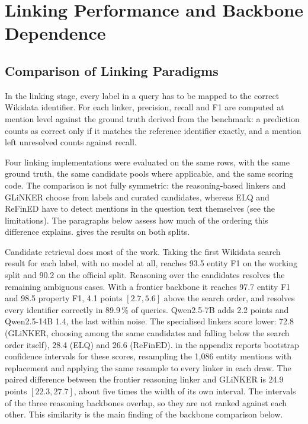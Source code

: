 \section{Linking Performance and Backbone
Dependence}

\subsection{Comparison of Linking
Paradigms}

\label{sec:res-linkers}

In the linking stage, every label in a query has to be mapped to the correct Wikidata identifier.
For each linker, precision, recall and F1 are computed at mention level against the ground truth derived from the benchmark: a prediction counts as correct only if it matches the reference identifier exactly, and a mention left unresolved counts against recall.



Four linking implementations were evaluated on the same rows, with the same ground truth, the same candidate pools where applicable, and the same scoring code.
The comparison is not fully symmetric: the reasoning-based linkers and GLiNKER choose from labels and curated candidates, whereas ELQ and ReFinED have to detect mentions in the question text themselves (see the limitations).
The paragraphs below assess how much of the ordering this difference explains.
 gives the results on both splits.

Candidate retrieval does most of the work.
Taking the first Wikidata search result for each label, with no model at all, reaches 93.5 entity F1 on the working split and 90.2 on the official split.
Reasoning over the candidates resolves the remaining ambiguous cases.
With a frontier backbone it reaches 97.7 entity F1 and 98.5 property F1, 4.1 points $[2.7, 5.6]$ above the search order, and resolves every identifier correctly in 89.9\,\% of queries.
Qwen2.5-7B adds 2.2 points and Qwen2.5-14B 1.4, the last within noise.
The specialised linkers score lower: 72.8 (GLiNKER, choosing among the same candidates and falling below the search order itself), 28.4 (ELQ) and 26.6 (ReFinED).
 in the appendix reports bootstrap confidence intervals for these scores, resampling the 1,086 entity mentions with replacement and applying the same resample to every linker in each draw.
The paired difference between the frontier reasoning linker and GLiNKER is 24.9 points $[22.3, 27.7]$, about five times the width of its own interval.
The intervals of the three reasoning backbones overlap, so they are not ranked against each other.
This similarity is the main finding of the backbone comparison below.

